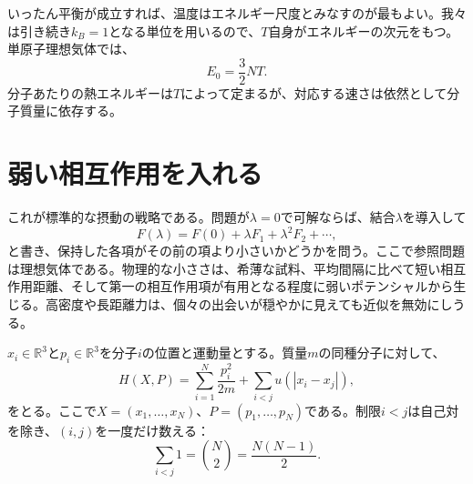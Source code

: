 \begin{classroomqa}
\end{classroomqa}

いったん平衡が成立すれば、温度はエネルギー尺度とみなすのが最もよい。我々は引き続き\(k_B=1\)となる単位を用いるので、\(T\)自身がエネルギーの次元をもつ。単原子理想気体では、
\begin{equation}
 E_0=\frac{3}{2}NT.
 \label{eq:sm6-ideal-energy}
\end{equation}
分子あたりの熱エネルギーは\(T\)によって定まるが、対応する速さは依然として分子質量に依存する。

\section{弱い相互作用を入れる}

\begin{classroomqa}
\end{classroomqa}

これが標準的な摂動の戦略である。問題が\(\lambda=0\)で可解ならば、結合\(\lambda\)を導入して
\begin{equation}
 F(\lambda)=F(0)+\lambda F_1+\lambda^2F_2+\cdots,
 \label{eq:sm6-perturbative-template}
\end{equation}
と書き、保持した各項がその前の項より小さいかどうかを問う。ここで参照問題は理想気体である。物理的な小ささは、希薄な試料、平均間隔に比べて短い相互作用距離、そして第一の相互作用項が有用となる程度に弱いポテンシャルから生じる。高密度や長距離力は、個々の出会いが穏やかに見えても近似を無効にしうる。

\(x_i\in\mathbb R^3\)と\(p_i\in\mathbb R^3\)を分子\(i\)の位置と運動量とする。質量\(m\)の同種分子に対して、
\begin{equation}
 H(X,P)=
 \sum_{i=1}^{N}\frac{p_i^2}{2m}
 +\sum_{i<j}u\!\left(|x_i-x_j|\right),
 \label{eq:sm6-interacting-hamiltonian}
\end{equation}
をとる。ここで\(X=(x_1,\ldots,x_N)\)、\(P=(p_1,\ldots,p_N)\)である。制限\(i<j\)は自己対を除き、\((i,j)\)を一度だけ数える：
\begin{equation}
 \sum_{i<j}1=\binom{N}{2}=\frac{N(N-1)}{2}.
 \label{eq:sm6-pair-count}
\end{equation}

